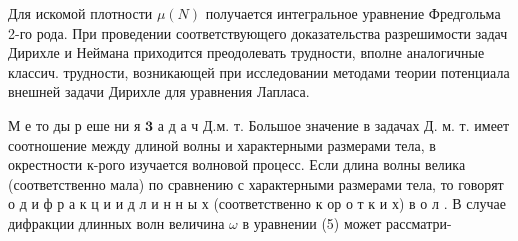 \documentclass[10pt]{article}
\begin{document}
Для искомой плотности $\mu(N)$ получается интегральное уравнение Фредгольма 2-го рода. При проведении соответствующего доказательства разрешимости задач Дирихле и Неймана приходится преодолевать трудности, вполне аналогичные классич. трудности, возникающей при исследовании методами теории потенциала внешней задачи Дирихле для уравнения Лапласа.



М е то ды р еше ни я $\mathbf{3}$ а д а ч Д.м. т. Большое значение в задачах Д. м. т. имеет соотношение между длиной волны и характерными размерами тела, в окрестности к-рого изучается волновой процесс. Если длина волны велика (соответственно мала) по сравнению с характерными размерами тела, то говорят о д и ф р а к ц и и д л и н н ы х (соответственно к ор о т к и х) в о л . В случае дифракции длинных волн величина $\omega$ в уравнении (5) может рассматри-
\end{document}
